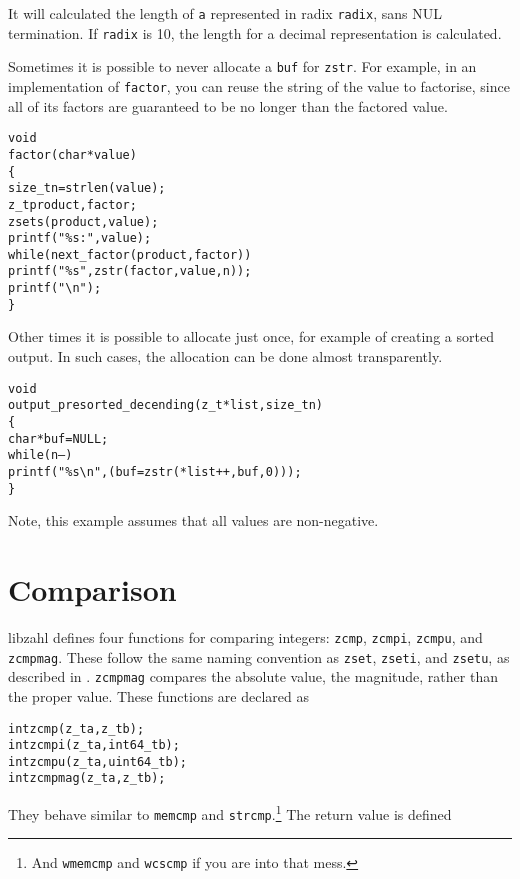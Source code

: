 \noindent
It will calculated the length of {\tt a} represented
in radix {\tt radix}, sans NUL termination. If
{\tt radix} is 10, the length for a decimal
representation is calculated.

Sometimes it is possible to never allocate a {\tt buf}
for {\tt zstr}. For example, in an implementation
of {\tt factor}, you can reuse the string of the
value to factorise, since all of its factors are
guaranteed to be no longer than the factored value.

\begin{alltt}
   void
   factor(char *value)
   \{
       size_t n = strlen(value);
       z_t product, factor;
       zsets(product, value);
       printf("\%s:", value);
       while (next_factor(product, factor))
           printf(" \%s", zstr(factor, value, n));
       printf("\verb|\|n");
   \}
\end{alltt}

Other times it is possible to allocate just
once, for example of creating a sorted output.
In such cases, the allocation can be done almost
transparently.

\begin{alltt}
   void
   output_presorted_decending(z_t *list, size_t n)
   \{
       char *buf = NULL;
       while (n--)
           printf("\%s\verb|\|n", (buf = zstr(*list++, buf, 0)));
   \}
\end{alltt}

\noindent
Note, this example assumes that all values are
non-negative.



\newpage
\section{Comparison}
\label{sec:Comparison}

libzahl defines four functions for comparing
integers: {\tt zcmp}, {\tt zcmpi}, {\tt zcmpu},
and {\tt zcmpmag}. These follow the same naming
convention as {\tt zset}, {\tt zseti}, and
{\tt zsetu}, as described in .
{\tt zcmpmag} compares the absolute value, the
magnitude, rather than the proper value. These
functions are declared as

\begin{alltt}
   int zcmp(z_t a, z_t b);
   int zcmpi(z_t a, int64_t b);
   int zcmpu(z_t a, uint64_t b);
   int zcmpmag(z_t a, z_t b);
\end{alltt}

\noindent
They behave similar to {\tt memcmp} and
{\tt strcmp}.\footnote{And {\tt wmemcmp} and
{\tt wcscmp} if you are into that mess.}
The return value is defined

